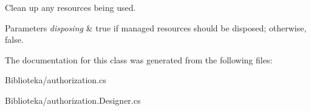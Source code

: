 Clean up any resources being used. 


\begin{DoxyParams}{Parameters}
{\em disposing} & true if managed resources should be disposed; otherwise, false.\\
\hline
\end{DoxyParams}


The documentation for this class was generated from the following files\+:\begin{DoxyCompactItemize}
\item 
Biblioteka/authorization.\+cs\item 
Biblioteka/authorization.\+Designer.\+cs\end{DoxyCompactItemize}
